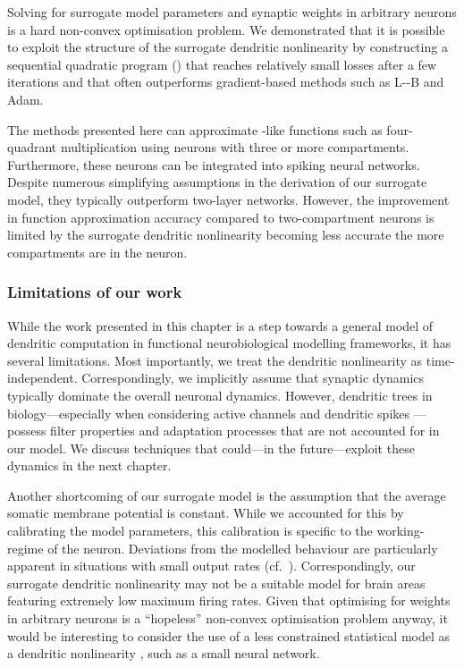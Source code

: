 Solving for surrogate model parameters and synaptic weights in arbitrary \nlif neurons is a hard non-convex optimisation problem.
We demonstrated that it is possible to exploit the structure of the surrogate dendritic nonlinearity by constructing a sequential quadratic program (\SQP) that reaches relatively small losses after a few iterations and that often outperforms gradient-based methods such as L-\BFGS-B and Adam.

The methods presented here can approximate \XOR-like functions such as four-quadrant multiplication using \nlif neurons with three or more compartments.
Furthermore, these neurons can be integrated into spiking neural networks.
Despite numerous simplifying assumptions in the derivation of our surrogate model, they typically outperform two-layer networks.
However, the improvement in function approximation accuracy compared to two-compartment neurons is limited by the surrogate dendritic nonlinearity becoming less accurate the more compartments are in the neuron.

\subsubsection{Limitations of our work}
While the work presented in this chapter is a step towards a general model of dendritic computation in functional neurobiological modelling frameworks, it has several limitations.
Most importantly, we treat the dendritic nonlinearity \Hden as time-independent.
Correspondingly, we implicitly assume that synaptic dynamics typically dominate the overall neuronal dynamics.
However, dendritic trees in biology---especially when considering active channels and dendritic spikes \citep{koch1999biophysics,koch2002singlecell}---possess filter properties and adaptation processes that are not accounted for in our model.
We discuss techniques that could---in the future---exploit these dynamics in the next chapter.

Another shortcoming of our surrogate model \Hden is the assumption that the average somatic membrane potential is constant.
While we accounted for this by calibrating the model parameters, this calibration is specific to the working-regime of the neuron.
Deviations from the modelled behaviour are particularly apparent in situations with small output rates (cf.~).
Correspondingly, our surrogate dendritic nonlinearity may not be a suitable model for brain areas featuring extremely low maximum firing rates.
Given that optimising for weights in arbitrary \nlif neurons is a \enquote{hopeless} non-convex optimisation problem anyway, it would be interesting to consider the use of a less constrained statistical model as a dendritic nonlinearity \Hden, such as a small neural network.

